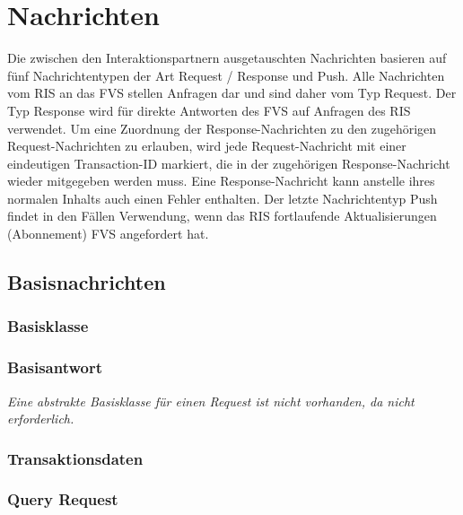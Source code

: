 \chapter{Nachrichten}
\label{cha:Nachrichten}
Die zwischen den Interaktionspartnern ausgetauschten Nachrichten basieren auf fünf Nachrichtentypen der Art Request / Response und Push. Alle Nachrichten vom RIS an das FVS stellen Anfragen dar und sind daher vom Typ Request. Der Typ Response wird für direkte Antworten des FVS auf Anfragen des RIS verwendet. Um eine Zuordnung der Response-Nachrichten zu den zugehörigen Request-Nachrichten zu erlauben, wird jede Request-Nachricht mit einer eindeutigen Transaction-ID markiert, die in der zugehörigen Response-Nachricht wieder mitgegeben werden muss. Eine Response-Nachricht kann anstelle ihres normalen Inhalts auch einen Fehler enthalten. Der letzte Nachrichtentyp Push findet in den Fällen Verwendung, wenn das RIS fortlaufende Aktualisierungen (Abonnement) FVS angefordert hat. 

\section{Basisnachrichten}
\label{sec:Nachrichten:Basisnachrichten}

\subsection*{Basisklasse}



\subsection*{Basisantwort}


\medskip

\textit{Eine abstrakte Basisklasse für einen Request ist nicht vorhanden, da nicht erforderlich.}

\subsection*{Transaktionsdaten}



\subsection*{Query Request}



